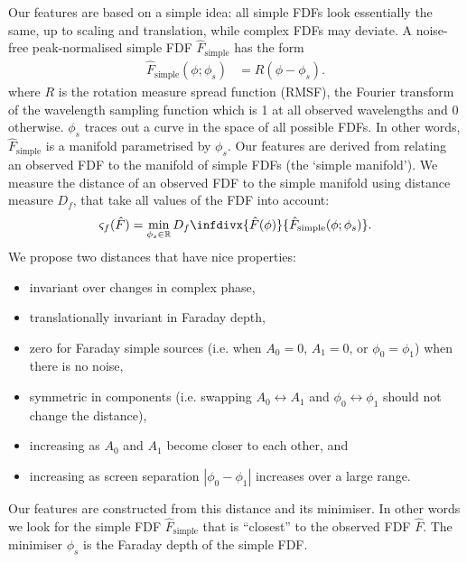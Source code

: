 \documentclass[11pt, a4paper]{book}
\begin{document}
    Our features are based on a simple idea: all simple FDFs look essentially the same, up to scaling and translation, while complex FDFs may deviate. A noise-free peak-normalised simple FDF $\hat F_{\mathrm{simple}}$ has the form
    \begin{align}
        \label{eq:faraday-f-simple}
        \hat F_{\mathrm{simple}}(\phi; \phi_s) &= R(\phi - \phi_s).
    \end{align}
    where $R$ is the rotation measure spread function (RMSF), the Fourier transform of the wavelength sampling function which is 1 at all observed wavelengths and 0 otherwise. $\phi_s$ traces out a curve in the space of all possible FDFs. In other words, $\hat F_{\mathrm{simple}}$ is a manifold parametrised by $\phi_s$. Our features are derived from relating an observed FDF to the manifold of simple FDFs (the `simple manifold'). We measure the distance of an observed FDF to the simple manifold using distance measure $D_f$, that take all values of the FDF into account:
    \begin{equation}
        \label{eq:faraday-complexity-model}
        \varsigma_f(\hat F) = \min_{\phi_s \in \mathbb{R}} D_f\infdivx{\hat F(\phi)}{\hat F_{\mathrm{simple}}(\phi; \phi_s)}.
    \end{equation}
    We propose two distances that have nice properties:
    \begin{itemize}
        \item invariant over changes in complex phase,
        \item translationally invariant in Faraday depth,
        \item zero for Faraday simple sources (i.e. when $A_0 = 0$, $A_1 = 0$, or $\phi_0 = \phi_1$) when there is no noise,
        \item symmetric in components (i.e. swapping $A_0 \leftrightarrow A_1$ and $\phi_0 \leftrightarrow \phi_1$ should not change the distance),
        \item increasing as $A_0$ and $A_1$ become closer to each other, and
        \item increasing as screen separation $|\phi_0 - \phi_1|$ increases over a large range.
    \end{itemize}
    Our features are constructed from this distance and its minimiser. In other words
    we look for the simple FDF $\hat{F}_{\mathrm{simple}}$ that is ``closest'' to the observed FDF $\hat{F}$.
    The minimiser $\phi_s$ is the Faraday depth of the simple FDF.
\end{document}
